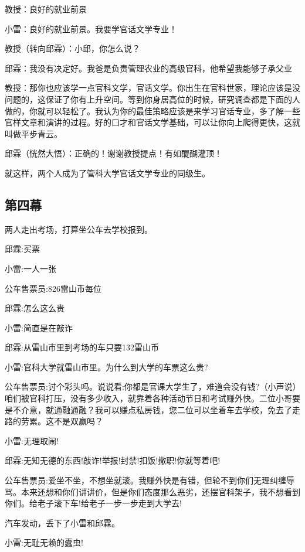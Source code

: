 \documentclass[UTF8,12pt,oneside]{ctexbook}
\begin{document}
    教授：良好的就业前景
    
    小雷：良好的就业前景。我要学官话文学专业！
    
    教授（转向邱霖）：小邱，你怎么说？
    
    邱霖：我没有决定好。我爸是负责管理农业的高级官科，他希望我能够子承父业
    
    教授：那你也应该学一点官科文学，官话文学。你出生在官科世家，理论应该是没问题的，这保证了你有上升空间。等到你身居高位的时候，研究调查都是下面的人做的，你就可以轻松了。我认为你的最佳策略应该是来学习官话专业，多了解一些官样文章和演讲的过程。好的口才和官话文学基础，可以让你向上爬得更快，这就叫做平步青云。
    
    邱霖（恍然大悟）：正确的！谢谢教授提点！有如醍醐灌顶！
    
    \fangsong
    就这样，两个人成为了管科大学官话文学专业的同级生。
    
    \songti
    
    \subsection{第四幕}
    \fangsong
    两人走出考场，打算坐公车去学校报到。
    
    \songti
    邱霖:买票
    
    小雷:一人一张
    
    公车售票员:826雷山币每位
    
    邱霖:怎么这么贵
    
    小雷:简直是在敲诈
    
    邱霖:从雷山市里到考场的车只要132雷山币
    
    小雷:官科大学就雷山市里。为什么到大学的车票这么贵?
    
    公车售票员:讨个彩头吗。说说看:你都是官课大学生了，难道会没有钱?（小声说）咱们被官科打压，没有多少收入，就靠着各种活动节日和考试赚外快。二位小哥要是不介意，就通融通融？我可以赚点私房钱，您二位可以坐着车去学校，免去了走路的劳累。这不是双赢吗？
    
    小雷:无理取闹!
    
    邱霖:无知无德的东西!敲诈!举报!封禁!扣饭!撤职!你就等着吧!
    
    公车售票员:爱坐不坐，不想坐就滚。我赚外快是有错，但轮不到你们无理纠缠辱骂。本来还想和你们讲讲价，但是你们态度那么恶劣，还摆官科架子，我不想看到你们。给老子滚下车!给老子一步一步走到大学去!
    
    \fangsong
    汽车发动，丢下了小雷和邱霖。
    
    \songti
    小雷:无耻无赖的蠹虫!
    
\end{document}
